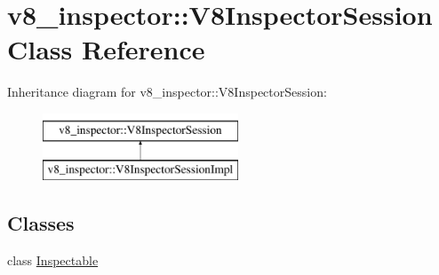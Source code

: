 \hypertarget{classv8__inspector_1_1V8InspectorSession}{}\section{v8\+\_\+inspector\+:\+:V8\+Inspector\+Session Class Reference}
\label{classv8__inspector_1_1V8InspectorSession}
Inheritance diagram for v8\+\_\+inspector\+:\+:V8\+Inspector\+Session\+:\begin{figure}[H]
\begin{center}
\leavevmode
\includegraphics[height=2.000000cm]{classv8__inspector_1_1V8InspectorSession}
\end{center}
\end{figure}
\subsection*{Classes}
\begin{DoxyCompactItemize}
\item 
class \mbox{\hyperlink{classv8__inspector_1_1V8InspectorSession_1_1Inspectable}{Inspectable}}
\end{DoxyCompactItemize}
